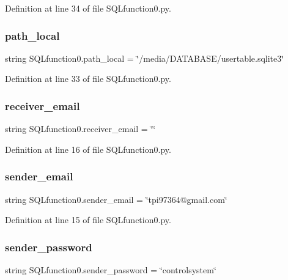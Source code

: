 Definition at line 34 of file S\+Q\+Lfunction0.\+py.

\mbox{\label{namespace_s_q_lfunction0_a3f5d6140bb4e035c4fecdc454748d6ff}} 
\subsubsection{path\+\_\+local}
{\footnotesize\ttfamily string S\+Q\+Lfunction0.\+path\+\_\+local = \char`\"{}/media/D\+A\+T\+A\+B\+A\+SE/usertable.\+sqlite3\char`\"{}}



Definition at line 33 of file S\+Q\+Lfunction0.\+py.

\mbox{\label{namespace_s_q_lfunction0_a02578384bdde34e6aaadd0765e20032b}} 
\subsubsection{receiver\+\_\+email}
{\footnotesize\ttfamily string S\+Q\+Lfunction0.\+receiver\+\_\+email = \char`\"{}\char`\"{}}



Definition at line 16 of file S\+Q\+Lfunction0.\+py.

\mbox{\label{namespace_s_q_lfunction0_ab8feea4f96d3fac4208e9eb36584803d}} 
\subsubsection{sender\+\_\+email}
{\footnotesize\ttfamily string S\+Q\+Lfunction0.\+sender\+\_\+email = \char`\"{}tpi97364@gmail.\+com\char`\"{}}



Definition at line 15 of file S\+Q\+Lfunction0.\+py.

\mbox{\label{namespace_s_q_lfunction0_aa1116be30f93f9a4a67b49ad586b477e}} 
\subsubsection{sender\+\_\+password}
{\footnotesize\ttfamily string S\+Q\+Lfunction0.\+sender\+\_\+password = \char`\"{}controlsystem\char`\"{}}



